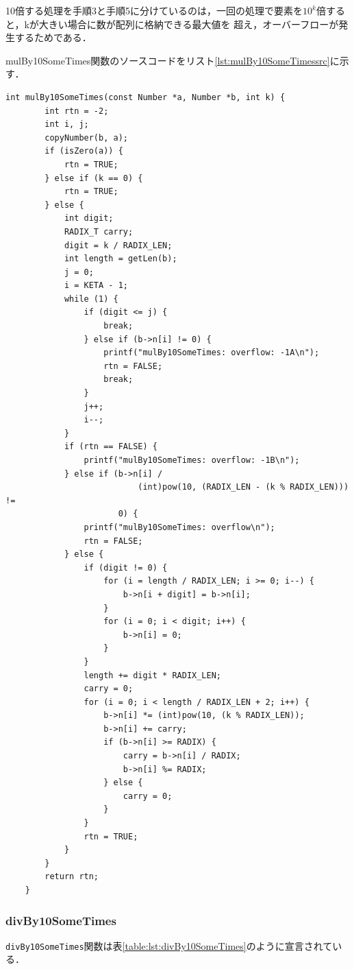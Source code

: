 \documentclass[a4paper,11pt,dvipdfmx]{jsarticle}
\begin{document}
10倍する処理を手順3と手順5に分けているのは，一回の処理で要素を$10^k$倍すると，kが大きい場合に数が配列に格納できる最大値を
超え，オーバーフローが発生するためである．

mulBy10SomeTimes関数のソースコードをリスト\ref{lst:mulBy10SomeTimessrc}に示す．

\begin{lstlisting}[caption=mulBy10SomeTimes関数,label=lst:mulBy10SomeTimessrc]
    int mulBy10SomeTimes(const Number *a, Number *b, int k) {
        int rtn = -2;
        int i, j;
        copyNumber(b, a);
        if (isZero(a)) {
            rtn = TRUE;
        } else if (k == 0) {
            rtn = TRUE;
        } else {
            int digit;
            RADIX_T carry;
            digit = k / RADIX_LEN;
            int length = getLen(b);
            j = 0;
            i = KETA - 1;
            while (1) {
                if (digit <= j) {
                    break;
                } else if (b->n[i] != 0) {
                    printf("mulBy10SomeTimes: overflow: -1A\n");
                    rtn = FALSE;
                    break;
                }
                j++;
                i--;
            }
            if (rtn == FALSE) {
                printf("mulBy10SomeTimes: overflow: -1B\n");
            } else if (b->n[i] /
                           (int)pow(10, (RADIX_LEN - (k % RADIX_LEN))) !=
                       0) {
                printf("mulBy10SomeTimes: overflow\n");
                rtn = FALSE;
            } else {
                if (digit != 0) {
                    for (i = length / RADIX_LEN; i >= 0; i--) {
                        b->n[i + digit] = b->n[i];
                    }
                    for (i = 0; i < digit; i++) {
                        b->n[i] = 0;
                    }
                }
                length += digit * RADIX_LEN;
                carry = 0;
                for (i = 0; i < length / RADIX_LEN + 2; i++) {
                    b->n[i] *= (int)pow(10, (k % RADIX_LEN));
                    b->n[i] += carry;
                    if (b->n[i] >= RADIX) {
                        carry = b->n[i] / RADIX;
                        b->n[i] %= RADIX;
                    } else {
                        carry = 0;
                    }
                }
                rtn = TRUE;
            }
        }
        return rtn;
    }
\end{lstlisting}

\subsubsection{divBy10SomeTimes}
\texttt{divBy10SomeTimes}関数は表\ref{table:lst:divBy10SomeTimes}のように宣言されている．
\end{document}

